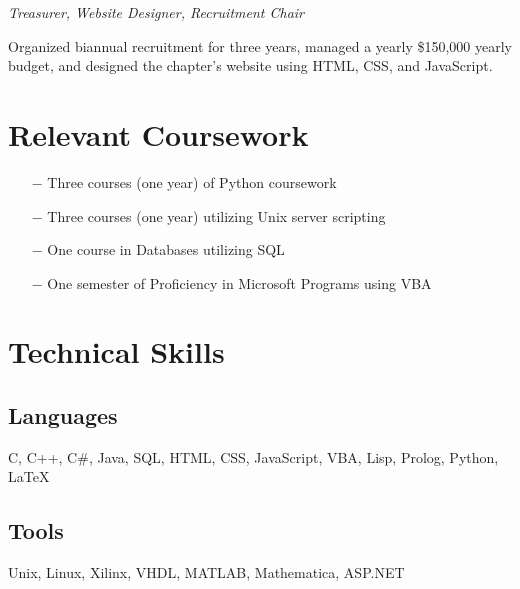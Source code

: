 \documentclass{article}
\begin{document}
\noindent\textit{Treasurer, Website Designer, Recruitment Chair}

Organized biannual recruitment for three years, managed a yearly \$150,000 yearly budget, and designed 
the chapter's website using HTML, CSS, and JavaScript.

\section{Relevant Coursework}

\begin{itemize}
	\item[$-$] Three courses (one year) of Python coursework
	\item[$-$] Three courses (one year) utilizing Unix server scripting
	\item[$-$] One course in Databases utilizing SQL
	\item[$-$] One semester of Proficiency in Microsoft Programs using VBA
\end{itemize}

\section{Technical Skills}

\subsection{Languages}

C, C++, C\#, Java, SQL, HTML, CSS, JavaScript, VBA, Lisp, Prolog, Python, \LaTeX

\subsection{Tools}

Unix, Linux, Xilinx, VHDL, MATLAB, Mathematica, ASP.NET
\end{document}
